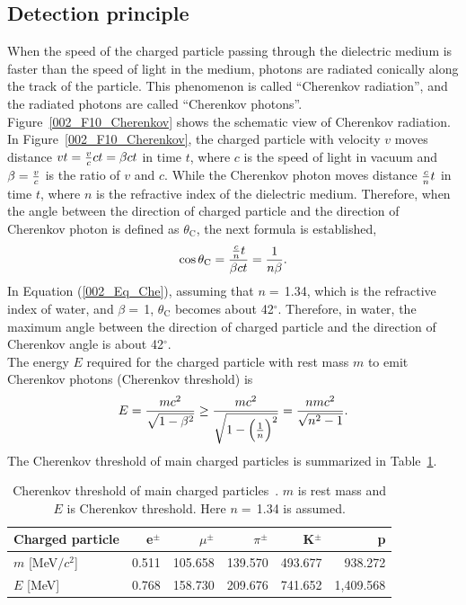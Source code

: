 \subsection{Detection principle}
\vs\hs When the speed of the charged particle passing through the dielectric medium is faster than the speed of light in the medium, photons are radiated conically along the track of the particle.
This phenomenon is called ``Cherenkov radiation'', and the radiated photons are called ``Cherenkov photons''.
Figure~\ref{002_F10_Cherenkov} shows the schematic view of Cherenkov radiation.
In Figure~\ref{002_F10_Cherenkov}, the charged particle with velocity $v$ moves distance $vt={v \over c}ct=\beta ct$ in time $t$, where $c$ is the speed of light in vacuum and $\beta={v \over c}$ is the ratio of $v$ and $c$.
While the Cherenkov photon moves distance ${c \over n}t$ in time $t$, where $n$ is the refractive index of the dielectric medium.
Therefore, when the angle between the direction of charged particle and the direction of Cherenkov photon is defined as $\theta_{\text{C}}$, the next formula is established,
\begin{eqnarray}\label{002_Eq_Che}
	\cos\theta_{\text{C}}={{c \over n}t \over \beta ct}={\text{1} \over n\beta}.
\end{eqnarray}
In Equation (\ref{002_Eq_Che}), assuming that $n=\,$1.34, which is the refractive index of water, and $\beta=\,$1, $\theta_{\text{C}}$ becomes about 42$^{\circ}$.
Therefore, in water, the maximum angle between the direction of charged particle and the direction of Cherenkov angle is about 42$^{\circ}$.\\
\hs The energy $E$ required for the charged particle with rest mass $m$ to emit Cherenkov photons (Cherenkov threshold) is
\begin{eqnarray}
	E={mc^{\text{2}} \over \sqrt{\text{1}-\beta^{\text{2}}}}\geq{mc^{\text{2}} \over \sqrt{\text{1}-\Big({\text{1} \over n}\Big)^{\text{2}}}}={nmc^{\text{2}} \over \sqrt{n^{\text{2}}-\text{1}}}.
\end{eqnarray}
The Cherenkov threshold of main charged particles is summarized in Table~\ref{002_Tab:Che}.

\begin{table}[h]
	\caption[Cherenkov threshold of main charged particles]{\label{002_Tab:Che} Cherenkov threshold of main charged particles~\cite{2022Workman}. $m$ is rest mass and $E$ is Cherenkov threshold. Here $n=\,$1.34 is assumed.}
	\centering
	\vs
	\begin{tabular}{lrrrrr}
		\hline\hline
		Charged particle&e$^{\pm}$&$\mu^{\pm}$&$\pi^{\pm}$&K$^{\pm}$&p\\
		\hline
		$m$ [MeV$/c^{\text{2}}$]&0.511&105.658&139.570&493.677&938.272\\
		$E$ [MeV]&0.768&158.730&209.676&741.652&1,409.568\\
		\hline\hline
	\end{tabular}
\end{table}

\newpage
